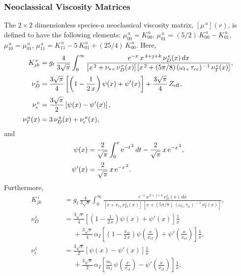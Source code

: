 \documentclass[12pt,prb,aps]{revtex4-1}
\begin{document}
\subsubsection{Neoclassical Viscosity Matrices}\label{vmatrix}
The $2\times 2$ dimensionless species-$a$ neoclassical viscosity matrix, $[\mu^{\,a}](r)$,  is defined to have the following elements:
$\mu_{00}^{\,a} = K_{00}^{\,a}$, $\mu_{01}^{\,a}= (5/2)\,K_{00}^{\,a}- K_{01}^{\,a}$,
$\mu_{10}^{\,a}= \mu_{01}^{\,a}$,
$\mu_{11}^{\,a} = K_{11}^{\,a} - 5\,K_{01}^{\,a}+(25/4)\,K_{00}^{\,a}$.
Here,
\begin{align}
 K_{jk}^{\,e} &= g_t\,\frac{4}{3\sqrt{\pi}}\int_0^\infty
\frac{e^{-x}\,x^{\,4+j+k}\,\nu_D^{\,e}(x)\,dx}{[x^{\,2}+\nu_{\ast\,e}\,\nu_D^{\,e}(x)]\,[x^{\,2}+(5\pi/8)\,(\omega_{t\,e}\,\tau_{ee})^{\,-1}\,\nu_T^{\,e}(x)]},\\[0.5ex]
\nu_D^{\,e}&= \frac{3\sqrt{\pi}}{4}\left[\left(1-\frac{1}{2\,x}\right)\psi(x)+\psi'(x)\right]+\frac{3\sqrt{\pi}}{4}\,Z_{\rm eff},\\[0.5ex]
\nu_\epsilon^{\,e}&= \frac{3\sqrt{\pi}}{2}\left[\psi(x)-\psi'(x)\right],\\[0.5ex]
\nu_T^{\,a}(x) &= 3\,\nu_D^{\,a}(x)+\nu_{\epsilon}^{\,a}(x),
\end{align}
and
\begin{align}
\psi(x) &= \frac{2}{\sqrt{\pi}}\int_0^x{\rm e}^{-t^{\,2}}\,dt -\frac{2}{\sqrt{\pi}}\,x\,{\rm e}^{-x^{\,2}},\\[0.5ex]
\psi'(x)&= \frac{2}{\sqrt{\pi}}\,x\,{\rm e}^{-x^{\,2}}.
\end{align}
Furthermore, 
\begin{align}
 K_{jk}^{\,i} &=g_t\,\frac{4}{3\sqrt{\pi}}\int_0^\infty
\frac{e^{-x}\,x^{\,2+j+k}\,\nu_D^{\,i}(x)\,dx}{[x+\nu_{\ast\,i}\,\nu_D^{\,i}(x)]\,[x+(5\pi/8)\,(\omega_{t\,i}\,\tau_{ii})^{\,-1}\,\nu_T^{\,i}(x)]},\\[0.5ex]
 \nu_D^{\,i}&= \frac{3\sqrt{\pi}}{4}\left[\left(1-\frac{1}{2\,x}\right)\psi(x)+\psi'(x)\right]\frac{1}{x}\nonumber\\[0.5ex]\phantom{===}
&\phantom{=}+\frac{3\sqrt{\pi}}{4}\,\alpha_I\left[\left(1-\frac{x_{iI}}{2\,x}\right)\psi\!\left(\frac{x}{x_{iI}}\right)
+\psi'\!\left(\frac{x}{x_{iI}}\right)\right]\frac{1}{x},\\[0.5ex]
 \nu_\epsilon^{\,i}&=\frac{3\sqrt{\pi}}{2}\left[\psi(x)-\psi'(x)\right]\frac{1}{x}\nonumber\\[0.5ex]\phantom{===}
&\phantom{=}+\frac{3\sqrt{\pi}}{2}\,\alpha_I\left[\frac{m_i}{m_I}\,\psi\!\left(\frac{x}{x_{iI}}\right)
-\psi'\!\left(\frac{x}{x_{iI}}\right)\right]\frac{1}{x},
\end{align}
\end{document}
